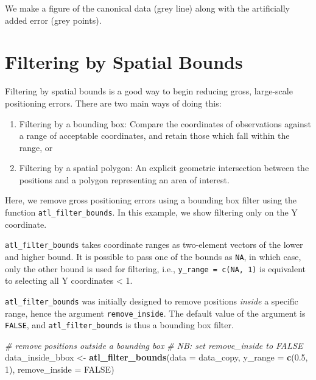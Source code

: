 \documentclass[
]{scrreprt}
\newenvironment{Shaded}{}{}
\newcommand{\CommentTok}[1]{\textcolor[rgb]{0.38,0.63,0.69}{\textit{#1}}}
\newcommand{\DataTypeTok}[1]{\textcolor[rgb]{0.56,0.13,0.00}{#1}}
\newcommand{\DecValTok}[1]{\textcolor[rgb]{0.25,0.63,0.44}{#1}}
\newcommand{\FloatTok}[1]{\textcolor[rgb]{0.25,0.63,0.44}{#1}}
\newcommand{\KeywordTok}[1]{\textcolor[rgb]{0.00,0.44,0.13}{\textbf{#1}}}
\newcommand{\NormalTok}[1]{#1}
\newcommand{\OtherTok}[1]{\textcolor[rgb]{0.00,0.44,0.13}{#1}}
\newcommand{\StringTok}[1]{\textcolor[rgb]{0.25,0.44,0.63}{#1}}
\begin{document}
We make a figure of the canonical data (grey line) along with the artificially added error (grey points).

\hypertarget{filtering-by-spatial-bounds}{%
\section{Filtering by Spatial Bounds}\label{filtering-by-spatial-bounds}}

Filtering by spatial bounds is a good way to begin reducing gross, large-scale positioning errors.
There are two main ways of doing this:

\begin{enumerate}
\def\labelenumi{\arabic{enumi}.}
\item
  Filtering by a bounding box: Compare the coordinates of observations against a range of acceptable coordinates, and retain those which fall within the range, or
\item
  Filtering by a spatial polygon: An explicit geometric intersection between the positions and a polygon representing an area of interest.
\end{enumerate}

Here, we remove gross positioning errors using a bounding box filter using the function \texttt{atl\_filter\_bounds}. In this example, we show filtering only on the Y coordinate.

\texttt{atl\_filter\_bounds} takes coordinate ranges as two-element vectors of the lower and higher bound.
It is possible to pass one of the bounds as \texttt{NA}, in which case, only the other bound is used for filtering, i.e., \texttt{y\_range\ =\ c(NA,\ 1)} is equivalent to selecting all Y coordinates \textless{} 1.

\texttt{atl\_filter\_bounds} was initially designed to remove positions \emph{inside} a specific range, hence the argument \texttt{remove\_inside}.
The default value of the argument is \texttt{FALSE}, and \texttt{atl\_filter\_bounds} is thus a bounding box filter.

\begin{Shaded}
\begin{Highlighting}[]
\CommentTok{\# remove positions outside a bounding box}
\CommentTok{\# NB: set remove\_inside to FALSE}
\NormalTok{data\_inside\_bbox <{-}}\StringTok{ }\KeywordTok{atl\_filter\_bounds}\NormalTok{(}\DataTypeTok{data =}\NormalTok{ data\_copy,}
                                      \DataTypeTok{y\_range =} \KeywordTok{c}\NormalTok{(}\FloatTok{0.5}\NormalTok{, }\DecValTok{1}\NormalTok{),}
                                      \DataTypeTok{remove\_inside =} \OtherTok{FALSE}\NormalTok{)}
\end{Highlighting}
\end{Shaded}
\end{document}
